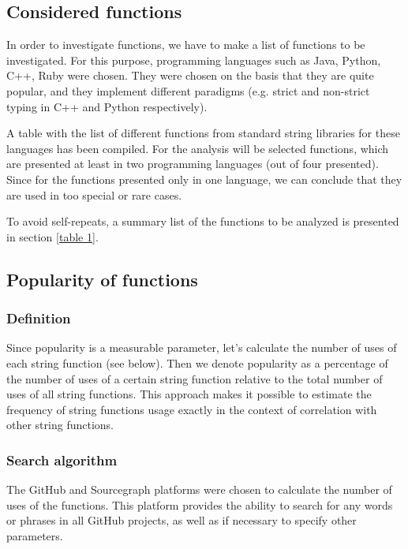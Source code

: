 \documentclass[anonymous,sigplan,review,11pt,nonacm,natbib=false]{acmart}
\begin{document}
    \subsection{Considered functions}

    In order to investigate functions, we have to make a list of functions to be investigated. For this purpose, programming languages such as Java, Python, C++, Ruby were chosen. They were chosen on the basis that they are quite popular, and they implement different paradigms (e.g. strict and non-strict typing in C++ and Python respectively).

    A table with the list of different functions from standard string libraries for these languages has been compiled. For the analysis will be selected functions, which are presented at least in two programming languages (out of four presented). Since for the functions presented only in one language, we can conclude that they are used in too special or rare cases.

    To avoid self-repeats, a summary list of the functions to be analyzed is presented in section \ref{table 1}.

    \subsection{Popularity of functions}

    \subsubsection{Definition}

    Since popularity is a measurable parameter, let's calculate the number of uses of each string function (see below). Then we denote popularity as a percentage of the number of uses of a certain string function relative to the total number of uses of all string functions. This approach makes it possible to estimate the frequency of string functions usage exactly in the context of correlation with other string functions.

    \subsubsection{Search algorithm}

    The GitHub and Sourcegraph platforms were chosen to calculate the number of uses of the functions. This platform provides the ability to search for any words or phrases in all GitHub projects, as well as if necessary to specify other parameters.
\end{document}
